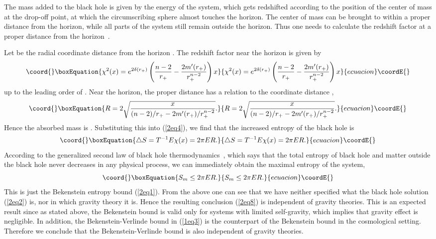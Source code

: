 \documentclass[a4paper,12pt]{article}
\begin{document}
The mass added to the black hole is given by the energy \coordHE{} of the system, which gets
redshifted according to the position of the center of mass at the drop-off point, at
which the circumscribing sphere almost touches the horizon. The center of mass can be
brought to within a proper distance \coordHE{} from the horizon, while all parts of the system
still remain outside the horizon. Thus one needs to calculate the redshift factor at a proper
distance \coordHE{} from the horizon~\cite{Bousso}.

Let \coordHE{} be the radial coordinate distance from the horizon \coordHE{}. The redshift
factor near the horizon is given by
\begin{equation}\coord{}\boxEquation{
\label{2eq5}
\chi ^2(x)= e^{2\delta(r_+)}\left( \frac{n-2}{r_+}-\frac{2m'(r_+)}{r_+^{n-2}}
  \right) x
}{
\chi ^2(x)= e^{2\delta(r_+)}\left( \frac{n-2}{r_+}-\frac{2m'(r_+)}{r_+^{n-2}}
  \right) x
}{ecuacion}\coordE{}\end{equation}
up to the leading order of \coordHE{}. Near the horizon, the proper distance \coordHE{} has a
relation to the coordinate distance \coordHE{},
\begin{equation}\coord{}\boxEquation{
R=2 \sqrt{\frac{x}{(n-2)/r_+ -2m'(r_+)/r_+^{n-2}}}.
}{
R=2 \sqrt{\frac{x}{(n-2)/r_+ -2m'(r_+)/r_+^{n-2}}}.
}{ecuacion}\coordE{}\end{equation}
Hence the absorbed mass is \coordHE{}. Substituting this
into (\ref{2eq4}), we find that the increased entropy of the black hole
is
\begin{equation}\coord{}\boxEquation{
\label{2eq7}
\triangle S = T^{-1} E \chi (x) = 2\pi ER.
}{
\triangle S = T^{-1} E \chi (x) = 2\pi ER.
}{ecuacion}\coordE{}\end{equation}
According to the generalized second law of black hole thermodynamics~\cite{Beke2},
which says that the total entropy of black hole and matter outside the black hole
never decreases in any physical process, we can immediately obtain the maximal
entropy of the system,
\begin{equation}\coord{}\boxEquation{
\label{2eq8}
S_m \le 2\pi ER.
}{
S_m \le 2\pi ER.
}{ecuacion}\coordE{}\end{equation}
This is just the Bekenstein entropy bound (\ref{2eq1}).  From the above one can see
that we have neither specified  what the black hole solution (\ref{2eq2}) is,
nor in which gravity theory it is. Hence the resulting conclusion (\ref{2eq8})
is independent of gravity theories. This is an expected result since as stated
above, the Bekenstein
bound is valid only for systems with limited self-gravity, which implies that gravity
effect is negligible.   In addition, the Bekenstein-Verlinde bound \coordHE{}
in (\ref{1eq3}) is the counterpart of the Bekenstein bound in the cosmological setting.
Therefore we conclude that the Bekenstein-Verlinde bound is also independent of
gravity theories.
\end{document}
